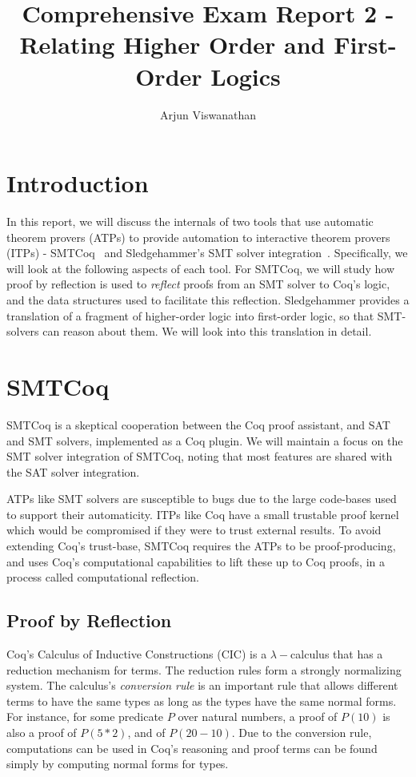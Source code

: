 \documentclass{article}
\begin{document}
\title{Comprehensive Exam Report 2 - Relating Higher Order and First-Order Logics}
\author{Arjun Viswanathan}
\date{}
\maketitle

\section{Introduction}
\label{sec:intro}
	In this report, we will discuss the 
	internals of two tools that use 
	automatic theorem provers (ATPs) to 
	provide automation to interactive 
	theorem provers (ITPs) - 
	SMTCoq~\cite{DBLP:phd/hal/Keller13} 
	and Sledgehammer's SMT solver 
	integration~\cite{bohme}. Specifically, 
	we will look at the following aspects 
	of each tool. For SMTCoq, we will study 
	how proof by reflection is used to 
	\textit{reflect} proofs from an SMT 
	solver to Coq's logic, and the data 
	structures used to facilitate this 
	reflection.	Sledgehammer provides a 
	translation of a fragment of 
	higher-order logic into first-order 
	logic, so that SMT-solvers can reason 
	about them. We will look into this 
	translation in detail.

\section{SMTCoq}
\label{sec:smtcoq}
	SMTCoq is a skeptical cooperation 
	between the Coq proof assistant, and 
	SAT and SMT solvers, implemented as a 
	Coq plugin. We will maintain a focus 
	on the SMT solver integration of 
	SMTCoq, noting that most features are 
	shared with the SAT	solver integration.
	
	ATPs like SMT solvers are susceptible 
	to bugs due to the large code-bases 
	used to support	their automaticity. 
	ITPs like Coq have a small trustable 
	proof kernel which would be 
	compromised if they were to trust
	external results. To avoid extending 
	Coq's trust-base, SMTCoq requires the 
	ATPs to be proof-producing, and uses 
	Coq's computational capabilities 
	to lift these up to Coq proofs, in a 
	process called computational 
	reflection. 
	
	\subsection{Proof by Reflection}
	\label{reflect}
	Coq's Calculus of Inductive 
	Constructions (CIC) is a 
	$\lambda-$calculus that has a 
	reduction mechanism for terms. The
	reduction rules form a strongly 
	normalizing system. The calculus's
	\textit{conversion rule} is an 
	important rule that allows different 
	terms to have the same types as 
	long as the types have the same 
	normal forms. For instance, for some 
	predicate $P$ over natural numbers, 
	a proof of $P(10)$ is also a proof 
	of $P(5*2)$, and of $P(20-10)$. Due 
	to the conversion rule, computations 
	can be used in Coq's reasoning and 
	proof terms can be found simply by 
	computing normal forms for types.
	
\end{document}
